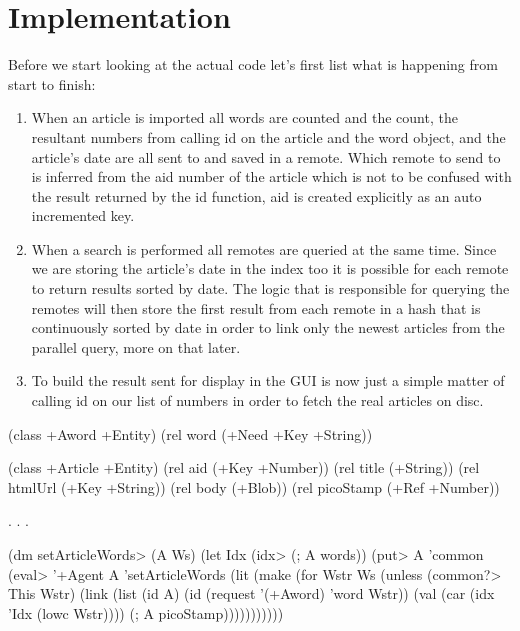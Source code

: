 \section{Implementation}
\label{sec:vizreader-implementation}

Before we start looking at the actual code let's first list what is happening from start to finish:

\begin{enumerate}
   \item When an article is imported all words are counted and the count, the resultant numbers from calling id on the article and the word object, and the article's date are all sent to and saved in a remote. Which remote to send to is inferred from the aid number of the article which is not to be confused with the result returned by the id function, aid is created explicitly as an auto incremented key.
\item When a search is performed all remotes are queried at the same time. Since we are storing the article's date in the index too it is possible for each remote to return results sorted by date. The logic that is responsible for querying the remotes will then store the first result from each remote in a hash that is continuously sorted by date in order to link only the newest articles from the parallel query, more on that later.
\item To build the result sent for display in the GUI is now just a simple matter of calling id on our list of numbers in order to fetch the real articles on disc.
\end{enumerate}

\begin{wideverbatim}
(class +Aword +Entity)
(rel word (+Need +Key +String))

(class +Article +Entity)
(rel aid       (+Key +Number))
(rel title     (+String))
(rel htmlUrl   (+Key +String))
(rel body      (+Blob))
(rel picoStamp (+Ref +Number))

. . .

\end{wideverbatim}

\begin{wideverbatim}

(dm setArticleWords> (A Ws)
   (let Idx (idx> (; A words))
      (put> A 'common
         (eval> '+Agent A 'setArticleWords
            (lit
               (make
                  (for Wstr Ws
                     (unless (common?> This Wstr)
                        (link
                           (list
                              (id A)
                              (id (request '(+Aword) 'word Wstr))
                              (val (car (idx 'Idx (lowc Wstr))))
                              (; A picoStamp)))))))))))
\end{wideverbatim}


